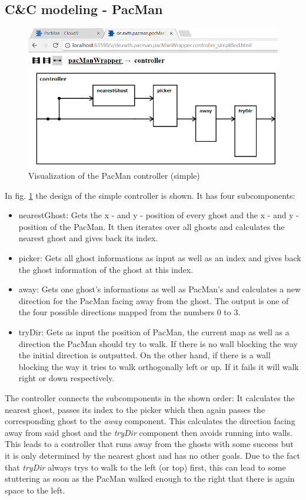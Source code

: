 \subsection{C\&C modeling - PacMan}
\begin{figure}
	\label{fig:visPacmanSimple}
	\centering
	\includegraphics[scale=0.7]{pictures/VisualizationPacManSimple.png}
	\caption{Visualization of the PacMan controller (simple)}
\end{figure}
In fig. \ref{fig:visPacmanSimple} the design of the simple controller is shown. It has four subcomponents:
\begin{itemize}
	\item nearestGhost: Gets the x - and y - position of every ghost and the x - and y - position of the PacMan. It then iterates over all ghosts and calculates the nearest ghost and gives back its index.
	\item picker: Gets all ghost informations as input as well as an index and gives back the ghost information of the ghost at this index.
	\item away: Gets one ghost's informations as well as PacMan's and calculates a new direction for the PacMan facing away from the ghost. The output is one of the four possible directions mapped from the numbers 0 to 3.
	\item tryDir: Gets as input the position of PacMan, the current map as well as a direction the PacMan should try to walk. If there is no wall blocking the way the initial direction is outputted. On the other hand, if there is a wall blocking the way it tries to walk orthogonally left or up. If it fails it will walk right or down respectively.
\end{itemize}
The controller connects the subcomponents in the shown order: It calculates the nearest ghost, passes its index to the picker which then again passes the corresponding ghost to the \textit{away} component. This calculates the direction facing away from said ghost and the \textit{tryDir} component then avoids running into walls. This leads to a controller that runs away from the ghosts with some success but it is only determined by the nearest ghost and has no other goals. Due to the fact that \textit{tryDir} always trys to walk to the left (or top) first, this can lead to some stuttering as soon as the PacMan walked enough to the right that there is again space to the left.